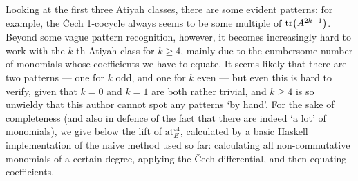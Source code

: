 \documentclass[11pt,fleqn]{article}
\theoremstyle{plain}
\theoremstyle{definition}
\theoremstyle{remark}
\numberwithin{equation}{theorem}
\newcommand{\at}{\mathrm{at}}
\newcommand{\expat}[1]{\at^{\circ#1}}
\begin{document}
        Looking at the first three Atiyah classes, there are some evident patterns: for example, the Čech 1-cocycle always seems to be some multiple of $\tr(A^{2k-1})$.
        Beyond some vague pattern recognition, however, it becomes increasingly hard to work with the $k$-th Atiyah class for $k\geqslant4$, mainly due to the cumbersome number of monomials whose coefficients we have to equate.
        It seems likely that there are two patterns --- one for $k$ odd, and one for $k$ even --- but even this is hard to verify, given that $k=0$ and $k=1$ are both rather trivial, and $k\geqslant4$ is so unwieldy that this author cannot spot any patterns `by hand'.
        For the sake of completeness (and also in defence of the fact that there are indeed `a lot' of monomials), we give below the lift of $\expat{4}_E$, calculated by a basic Haskell implementation of the naive method used so far: calculating all non-commutative monomials of a certain degree, applying the Čech differential, and then equating coefficients.
\end{document}
